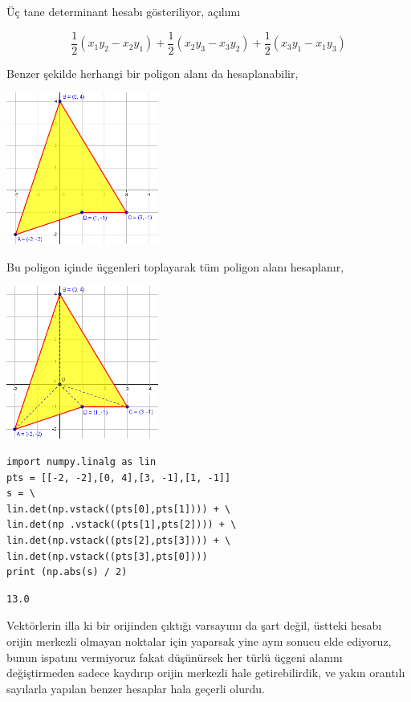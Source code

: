 \documentclass[12pt,fleqn]{article}\usepackage{../../common}
\begin{document}
Üç tane determinant hesabı gösteriliyor, açılımı

$$
\frac{1}{2} (x_1 y_2  - x_2 y_1) + 
\frac{1}{2} (x_2 y_3  - x_3 y_2) + 
\frac{1}{2} (x_3 y_1  - x_1 y_3) 
$$

Benzer şekilde herhangi bir poligon alanı da hesaplanabilir,

\includegraphics[width=5cm]{triar1.png}

Bu poligon içinde üçgenleri toplayarak tüm poligon alanı hesaplanır,

\includegraphics[width=5cm]{triar2.png}

\begin{verbatim}
import numpy.linalg as lin
pts = [[-2, -2],[0, 4],[3, -1],[1, -1]]
s = \
lin.det(np.vstack((pts[0],pts[1]))) + \
lin.det(np .vstack((pts[1],pts[2]))) + \
lin.det(np.vstack((pts[2],pts[3]))) + \
lin.det(np.vstack((pts[3],pts[0])))
print (np.abs(s) / 2)
\end{verbatim}

\begin{verbatim}
13.0
\end{verbatim}

Vektörlerin illa ki bir orijinden çıktığı varsayımı da şart değil, üstteki
hesabı orijin merkezli olmayan noktalar için yaparsak yine aynı sonucu elde
ediyoruz, bunun ispatını vermiyoruz fakat düşünürsek her türlü üçgeni alanını
değiştirmeden sadece kaydırıp orijin merkezli hale getirebilirdik, ve yakın
orantılı sayılarla yapılan benzer hesaplar hala geçerli olurdu.
\end{document}
